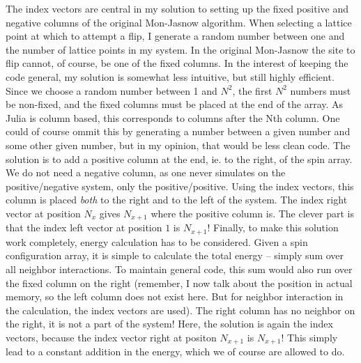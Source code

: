\documentclass{article}
\begin{document}
The index vectors are central in my solution to setting up the fixed positive and negative columns of the original Mon-Jasnow algorithm.
When selecting a lattice point at which to attempt a flip, I generate a random number between one and the number of lattice points in my system.
In the original Mon-Jasnow the site to flip cannot, of course, be one of the fixed columns.
In the interest of keeping the code general, my solution is somewhat less intuitive, but still highly efficient.
Since we choose a random number between 1 and $N^2$, the first $N^2$ numbers must be non-fixed, and the fixed columns must be placed at the end of the array.
As Julia is column based, this corresponds to columns after the Nth column.
One could of course ommit this by generating a number between a given number and some other given number, but in my opinion, that would be less clean code.
The solution is to add a positive column at the end, ie. to the right, of the spin array.
We do not need a negative column, as one never simulates on the positive/negative system, only the positive/positive.
Using the index vectors, this column is placed \emph{both} to the right and to the left of the system.
The index right vector at position $N_x$ gives $N_{x+1}$ where the positive column is.
The clever part is that the index left vector at position $1$ is $N_{x+1}$!
Finally, to make this solution work completely, energy calculation has to be considered.
Given a spin configuration array, it is simple to calculate the total energy -- simply sum over all neighbor interactions.
To maintain general code, this sum would also run over the fixed column on the right (remember, I now talk about the position in actual memory, so the left column does not exist here. But for neighbor interaction in the calculation, the index vectors are used).
The right column has no neighbor on the right, it is not a part of the system!
Here, the solution is again the index vectors, because the index vector right at positon $N_{x+1}$ is $N_{x+1}$!
This simply lead to a constant addition in the energy, which we of course are allowed to do.
\end{document}
